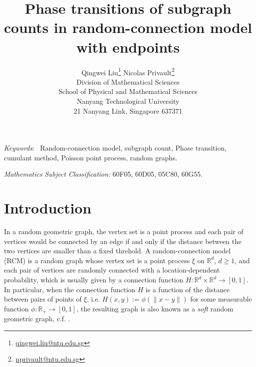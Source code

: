 \documentclass[12pt]{article}
\newcommand{\R}{\mathbb{R}}
\numberwithin{equation}{section}
\begin{document}
\title{
\huge
 Phase transitions of subgraph counts in random-connection model with endpoints
} 

\author{
  Qingwei Liu\footnote{\href{mailto:qingwei.liu@ntu.edu.sg}{qingwei.liu@ntu.edu.sg}}
  \qquad
      Nicolas Privault\footnote{
\href{mailto:nprivault@ntu.edu.sg}{nprivault@ntu.edu.sg}
}
  \\
\small
Division of Mathematical Sciences
\\
\small
School of Physical and Mathematical Sciences
\\
\small
Nanyang Technological University
\\
\small
21 Nanyang Link, Singapore 637371
}

\maketitle

\vspace{-0.5cm}

\begin{abstract} 

\end{abstract}
\noindent\emph{Keywords}:~
Random-connection model, 
subgraph count,
Phase transition,
cumulant method,
Poisson point process,
random graphs.

\noindent 
{\em Mathematics Subject Classification:} 
60F05, %
60D05, %
05C80, %
60G55. %
 
\baselineskip0.7cm

\section{Introduction}
In a random geometric graph, the vertex set is a point process and each pair of vertices would be connected by an edge if and only if the distance between the two vertices are smaller than a fixed threhold. 
A random-connection model (RCM) is a random graph whose vertex set is a point process $\xi$ on $\R^d$, $d\ge1$, and each pair of vertices are randomly connected with a location-dependent probability, which is usually given by a connection function $H:\R^d\times \R^d\to[0,1]$. In particular, when the connection function $H$ is a function of the distance between pairs of points of $\xi$, i.e. $H(x,y):=\phi(\|x-y\|)$ for some measurable function $\phi:\R_+\to[0,1]$, the resulting graph is also known as a {\it soft} random geometric graph, c.f. \cite{penrose16,LNS21}. 
\end{document}
